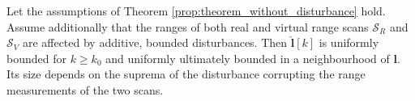\begin{theorem}
  \label{prop:theorem_with_disturbance} Let the assumptions of Theorem
  \ref{prop:theorem_without_disturbance} hold. Assume additionally that the
  ranges of both real and virtual range scans $\mathcal{S}_R$ and
  $\mathcal{S}_V$ are affected by additive, bounded disturbances. Then
  $\hat{\bm{l}}[k]$ is uniformly bounded for $k \geq k_0$ and uniformly
  ultimately bounded in a neighbourhood of $\bm{l}$. Its size depends on the
  suprema of the disturbance corrupting the range measurements of the two
  scans.
\end{theorem}
